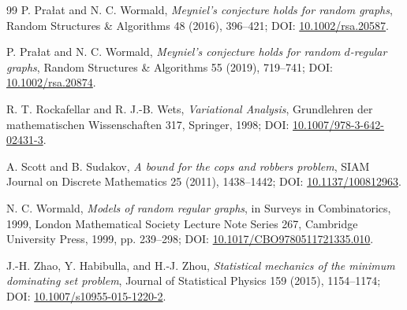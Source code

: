 \documentclass[11pt]{amsart}
\theoremstyle{definition}
\begin{document}
\begin{thebibliography}{99}
P. Pra\l at and N. C. Wormald,
\emph{Meyniel's conjecture holds for random graphs},
Random Structures \& Algorithms 48 (2016), 396--421; DOI: \href{https://doi.org/10.1002/rsa.20587}{10.1002/rsa.20587}.

P. Pra\l at and N. C. Wormald,
\emph{Meyniel's conjecture holds for random $d$-regular graphs},
Random Structures \& Algorithms 55 (2019), 719--741; DOI: \href{https://doi.org/10.1002/rsa.20874}{10.1002/rsa.20874}.

R. T. Rockafellar and R. J.-B. Wets,
\emph{Variational Analysis},
Grundlehren der mathematischen Wissenschaften 317, Springer, 1998; DOI: \href{https://doi.org/10.1007/978-3-642-02431-3}{10.1007/978-3-642-02431-3}.

A. Scott and B. Sudakov,
\emph{A bound for the cops and robbers problem},
SIAM Journal on Discrete Mathematics 25 (2011), 1438--1442; DOI: \href{https://doi.org/10.1137/100812963}{10.1137/100812963}.

N. C. Wormald,
\emph{Models of random regular graphs},
in Surveys in Combinatorics, 1999, London Mathematical Society Lecture Note Series 267, Cambridge University Press, 1999, pp. 239--298; DOI: \href{https://doi.org/10.1017/CBO9780511721335.010}{10.1017/CBO9780511721335.010}.

J.-H. Zhao, Y. Habibulla, and H.-J. Zhou,
\emph{Statistical mechanics of the minimum dominating set problem},
Journal of Statistical Physics 159 (2015), 1154--1174; DOI: \href{https://doi.org/10.1007/s10955-015-1220-2}{10.1007/s10955-015-1220-2}.
\end{thebibliography}
\end{document}
